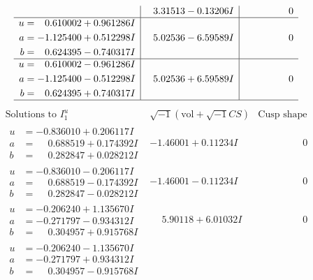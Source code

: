 \documentclass[1p]{elsarticle_modified}
\theoremstyle{definition}
\newcommand{\I}{\sqrt{-1}}
\begin{document}
$$\begin{array}{c|c|c}
 & \phantom{-}3.31513 - 0.13206 I & \phantom{-0.000000 } 0 \\ \hline\begin{aligned}
u &= \phantom{-}0.610002 + 0.961286 I \\
a &= -1.125400 + 0.512298 I \\
b &= \phantom{-}0.624395 - 0.740317 I\end{aligned}
 & \phantom{-}5.02536 - 6.59589 I & \phantom{-0.000000 } 0 \\ \hline\begin{aligned}
u &= \phantom{-}0.610002 - 0.961286 I \\
a &= -1.125400 - 0.512298 I \\
b &= \phantom{-}0.624395 + 0.740317 I\end{aligned}
 & \phantom{-}5.02536 + 6.59589 I & \phantom{-0.000000 } 0\\
 \hline 
 \end{array}$$\newpage$$\begin{array}{c|c|c}  
\text{Solutions to }I^u_{1}& \I (\text{vol} + \sqrt{-1}CS) & \text{Cusp shape}\\
 \hline 
\begin{aligned}
u &= -0.836010 + 0.206117 I \\
a &= \phantom{-}0.688519 + 0.174392 I \\
b &= \phantom{-}0.282847 + 0.028212 I\end{aligned}
 & -1.46001 + 0.11234 I & \phantom{-0.000000 } 0 \\ \hline\begin{aligned}
u &= -0.836010 - 0.206117 I \\
a &= \phantom{-}0.688519 - 0.174392 I \\
b &= \phantom{-}0.282847 - 0.028212 I\end{aligned}
 & -1.46001 - 0.11234 I & \phantom{-0.000000 } 0 \\ \hline\begin{aligned}
u &= -0.206240 + 1.135670 I \\
a &= -0.271797 - 0.934312 I \\
b &= \phantom{-}0.304957 + 0.915768 I\end{aligned}
 & \phantom{-}5.90118 + 6.01032 I & \phantom{-0.000000 } 0 \\ \hline\begin{aligned}
u &= -0.206240 - 1.135670 I \\
a &= -0.271797 + 0.934312 I \\
b &= \phantom{-}0.304957 - 0.915768 I\end{aligned}

\end{array}$$
\end{document}
